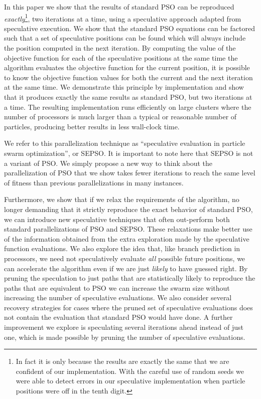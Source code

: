 \documentclass[smallcondensed]{svjour3}
\begin{document}
In this paper we show that the results of standard PSO can be reproduced
\emph{exactly}\footnote{In fact it is only because the results are exactly the
same that we are confident of our implementation.  With the careful use of
random seeds we were able to detect errors in our speculative implementation
when particle positions were off in the tenth digit.}, two iterations at a
time, using a speculative approach adapted from speculative execution. We show
that the standard PSO equations can be factored such that a set of speculative
positions can be found which will always include the position computed in the
next iteration.  By computing the value of the objective function for each of
the speculative positions at the same time the algorithm evaluates the
objective function for the current position, it is possible to know the
objective function values for both the current and the next iteration at the
same time.  We demonstrate this principle by implementation and show that it
produces exactly the same results as standard PSO, but two iterations at a
time.  The resulting implementation runs efficiently on large clusters where
the number of processors is much larger than a typical or reasonable number of
particles, producing better results in less wall-clock time.

We refer to this parallelization technique as ``speculative evaluation in
particle swarm optimization'', or SEPSO.  It is important to note here that
SEPSO is not a variant of PSO.  We simply propose a new way to think about the
parallelization of PSO that we show takes fewer iterations to reach the same
level of fitness than previous parallelizations in many instances.

Furthermore, we show that if we relax the requirements of the algorithm, no
longer demanding that it strictly reproduce the exact behavior of standard PSO,
we can introduce new speculative techniques that often out-perform both
standard parallelizations of PSO and SEPSO.  These relaxations make better use
of the information obtained from the extra exploration made by the speculative
function evaluations.  We also explore the idea that, like branch prediction in
processors, we need not speculatively evaluate \emph{all} possible future
positions, we can accelerate the algorithm even if we are just \emph{likely} to
have guessed right.  By pruning the speculation to just paths that are
statistically likely to reproduce the paths that are equivalent to PSO we can
increase the swarm size without increasing the number of speculative
evaluations.  We also consider several recovery strategies for cases where the
pruned set of speculative evaluations does not contain the evaluation that
standard PSO would have done.  A further improvement we explore is speculating
several iterations ahead instead of just one, which is made possible by pruning
the number of speculative evaluations.
\end{document}
